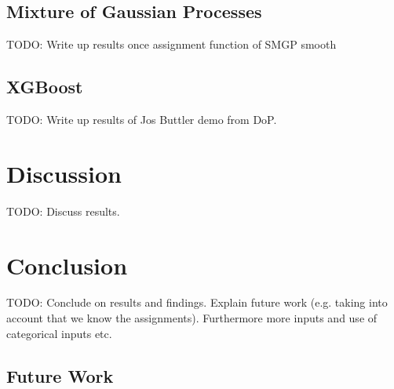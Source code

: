 \documentclass[12pt,a4paper]{report}
\theoremstyle{definition}
\begin{document}
\section{Mixture of Gaussian Processes}

TODO: Write up results once assignment function of SMGP smooth

\section{XGBoost}

TODO: Write up results of Jos Buttler demo from DoP.

\chapter{Discussion}

TODO: Discuss results.

\chapter{Conclusion}

TODO: Conclude on results and findings. Explain future work (e.g. taking into account that we know the assignments). Furthermore more inputs and use of categorical inputs etc.

\section{Future Work}

\end{document}
